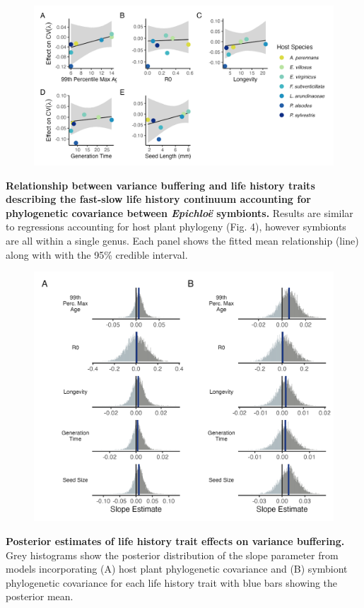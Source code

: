 \documentclass[12pt]{article}
\begin{document}
\begin{figure}
	\centering
	\includegraphics[width=\linewidth]{lh_epichloe_plot.png}
\end{figure}
 \textbf{Relationship between variance buffering and life history traits describing the fast-slow life history continuum accounting for phylogenetic covariance between \emph{Epichlo\"{e}} symbionts.} Results are similar to regressions accounting for host plant phylogeny (Fig. 4), however symbionts are all within a single genus. Each panel shows the fitted mean relationship (line) along with with the 95\% credible interval.
\newpage


\begin{figure}
	\centering
	\includegraphics[width=.8\linewidth]{lh_slopes_plot.png}
\end{figure}
 \textbf{Posterior estimates of life history trait effects on variance buffering.} Grey histograms show the posterior distribution of the slope parameter from models incorporating (A) host plant phylogenetic covariance and (B) symbiont phylogenetic covariance for each life history trait with blue bars showing the posterior mean.
\newpage
\end{document}
